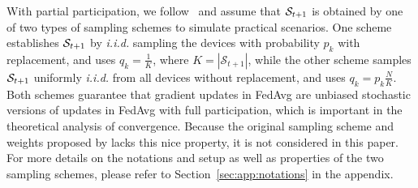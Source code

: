 With partial participation, we follow~\cite{li2018federated,karimireddy2019scaffold,li2019convergence} and assume that ${\mathcal{S}}_{t+1}$ is obtained by one of two types of
sampling schemes to simulate practical scenarios. One scheme establishes ${\mathcal{S}}_{t+1}$ by \emph{i.i.d.} sampling the devices with probability $p_k$ with replacement, and uses $q_k=\frac{1}{K}$, where $K=|\mathcal{S}_{t+1}|$, while the other scheme samples ${\mathcal{S}}_{t+1}$ uniformly \emph{i.i.d.} from all devices without replacement, and uses $q_k=p_k\frac{N}{K}$.
Both schemes
guarantee that gradient updates in FedAvg are unbiased stochastic versions of
updates in FedAvg with full participation, which is important in the theoretical analysis of convergence. Because the original sampling scheme and weights proposed by \cite{mcmahan2016communication} lacks this nice property, it is not considered in this paper. For 
more details on the notations and setup as well as properties of the two sampling schemes, please refer to Section~\ref{sec:app:notations} in the appendix.





